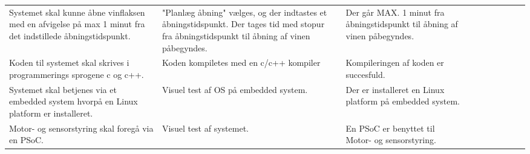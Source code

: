 \begin{longtable}{ TX TX TX TX TX }
	Systemet skal kunne åbne vinflaksen med en afvigelse på max 1 minut fra det indstillede åbningstidspunkt.& "Planlæg åbning" vælges, og der indtastes et åbningstidspunkt. Der tages tid med stopur fra åbningstidspunkt til åbning af vinen påbegyndes.& Der går MAX. 1 minut fra åbningstidspunkt til åbning af vinen påbegyndes. & &\\ 
	  
	Koden til systemet skal skrives i programmerings sprogene c og c++.& Koden kompiletes med en c/c++ kompiler& Kompileringen af koden er succesfuld. & &\\ 
	
	Systemet skal betjenes via et embedded system hvorpå en Linux platform er installeret.& Visuel test af OS på embedded system.& Der er installeret en Linux platform på embedded system. & &\\ 
	
	Motor- og sensorstyring skal foregå via en PSoC.& Visuel test af systemet.& En PSoC er benyttet til Motor- og sensorstyring.& & \\  



\end{longtable}